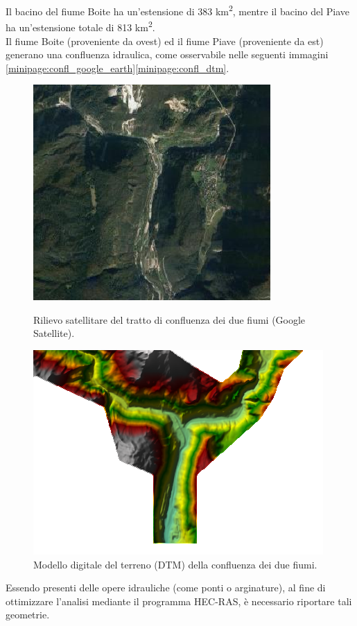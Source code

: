 Il bacino del fiume Boite ha un'estensione di 383 \unit{km^2}, mentre il bacino del Piave ha un'estensione totale di 813 \unit{km^2}.\\
Il fiume Boite (proveniente da ovest) ed il fiume Piave (proveniente da est) generano una confluenza idraulica, come osservabile nelle seguenti immagini \eqref{minipage:confl_google_earth}\eqref{minipage:confl_dtm}.

\begin{figure}[htb] \centering
    \begin{minipage}[]{7cm}
\includegraphics[scale=0.80]{immagini/confl_google_earth.PNG}
\caption{Rilievo satellitare del tratto di confluenza dei due fiumi (Google Satellite).}
\label{minipage:confl_google_earth}    
    \end{minipage}
        \hspace{2cm}
    \begin{minipage}[]{7cm}
        \includegraphics[scale=0.90]{immagini/confl_dtm.PNG}
        \caption{Modello digitale del terreno (DTM) della confluenza dei due fiumi.}
    \label{minipage:confl_dtm}
    \end{minipage} 
        \end{figure}
Essendo presenti delle opere idrauliche (come ponti o arginature), al fine di ottimizzare l'analisi mediante il programma HEC-RAS, è necessario riportare tali geometrie.

